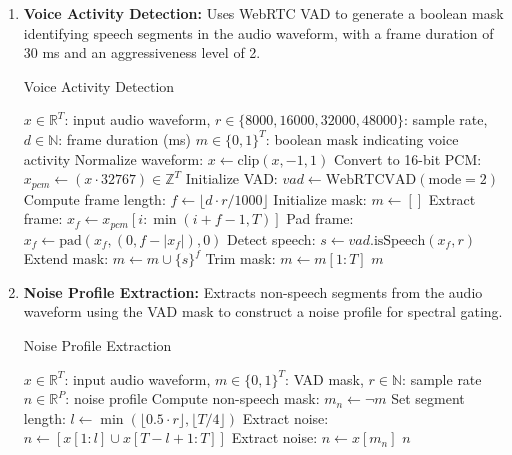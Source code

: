 \documentclass[../main.tex]{subfiles}
\begin{document}
\begin{enumerate}
    \item \textbf{Voice Activity Detection:} Uses WebRTC VAD to generate a boolean mask identifying speech segments in the audio waveform, with a frame duration of 30 ms and an aggressiveness level of 2.

    \begin{breakablealgorithm}{Voice Activity Detection}
    \begin{algorithmic}[1]
    \Require $x \in \mathbb{R}^T$: input audio waveform, $r \in \{8000, 16000, 32000, 48000\}$: sample rate, $d \in \mathbb{N}$: frame duration (ms)
    \Ensure $m \in \{0, 1\}^T$: boolean mask indicating voice activity
    \State Normalize waveform: $x \gets \text{clip}(x, -1, 1)$ 
    \State Convert to 16-bit PCM: $x_{pcm} \gets (x \cdot 32767) \in \mathbb{Z}^T$ 
    \State Initialize VAD: $vad \gets \text{WebRTCVAD}(\text{mode}=2)$ 
    \State Compute frame length: $f \gets \lfloor d \cdot r / 1000 \rfloor$ 
    \State Initialize mask: $m \gets []$
     
        \State Extract frame: $x_f \gets x_{pcm}[i : \min(i+f-1, T)]$ 
         
            \State Pad frame: $x_f \gets \text{pad}(x_f, (0, f - |x_f|), 0)$ 
        \EndIf
        \State Detect speech: $s \gets vad.\text{isSpeech}(x_f, r)$ 
        \State Extend mask: $m \gets m \cup \{s\}^f$ 
    \EndFor
    \State Trim mask: $m \gets m[1 : T]$ 
    \State \Return $m$ 
    \end{algorithmic}
    \end{breakablealgorithm}

    \item \textbf{Noise Profile Extraction:} Extracts non-speech segments from the audio waveform using the VAD mask to construct a noise profile for spectral gating.

    \begin{breakablealgorithm}{Noise Profile Extraction}
    \begin{algorithmic}[1]
    \Require $x \in \mathbb{R}^T$: input audio waveform, $m \in \{0, 1\}^T$: VAD mask, $r \in \mathbb{N}$: sample rate
    \Ensure $n \in \mathbb{R}^P$: noise profile
    \State Compute non-speech mask: $m_n \gets \neg m$ 
     
        \State Set segment length: $l \gets \min(\lfloor 0.5 \cdot r \rfloor, \lfloor T / 4 \rfloor)$ 
        \State Extract noise: $n \gets [x[1 : l] \cup x[T-l+1 : T]]$ 
    \Else
        \State Extract noise: $n \gets x[m_n]$ 
    \EndIf
    \State \Return $n$ 
    \end{algorithmic}
    \end{breakablealgorithm}


\end{enumerate}
\end{document}
